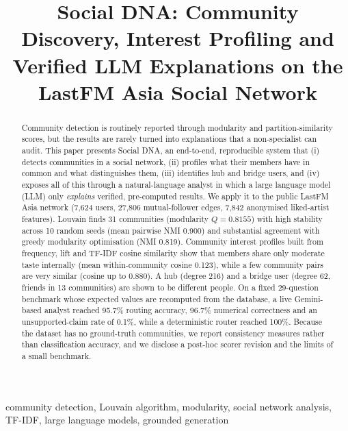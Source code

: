 \documentclass[conference]{IEEEtran}
\begin{document}
\title{Social DNA: Community Discovery, Interest Profiling and Verified LLM Explanations on the LastFM Asia Social Network}

\author{
}

\maketitle

\begin{abstract}
Community detection is routinely reported through modularity and partition-similarity scores, but the results are rarely turned into explanations that a non-specialist can audit. This paper presents Social DNA, an end-to-end, reproducible system that (i) detects communities in a social network, (ii) profiles what their members have in common and what distinguishes them, (iii) identifies hub and bridge users, and (iv) exposes all of this through a natural-language analyst in which a large language model (LLM) only \emph{explains} verified, pre-computed results. We apply it to the public LastFM Asia network (7{,}624 users, 27{,}806 mutual-follower edges, 7{,}842 anonymised liked-artist features). Louvain finds 31 communities (modularity $Q=0.8155$) with high stability across 10 random seeds (mean pairwise NMI 0.900) and substantial agreement with greedy modularity optimisation (NMI 0.819). Community interest profiles built from frequency, lift and TF-IDF cosine similarity show that members share only moderate taste internally (mean within-community cosine 0.123), while a few community pairs are very similar (cosine up to 0.880). A hub (degree 216) and a bridge user (degree 62, friends in 13 communities) are shown to be different people. On a fixed 29-question benchmark whose expected values are recomputed from the database, a live Gemini-based analyst reached 95.7\% routing accuracy, 96.7\% numerical correctness and an unsupported-claim rate of 0.1\%, while a deterministic router reached 100\%. Because the dataset has no ground-truth communities, we report consistency measures rather than classification accuracy, and we disclose a post-hoc scorer revision and the limits of a small benchmark.
\end{abstract}

\begin{IEEEkeywords}
community detection, Louvain algorithm, modularity, social network analysis, TF-IDF, large language models, grounded generation
\end{IEEEkeywords}
\end{document}
